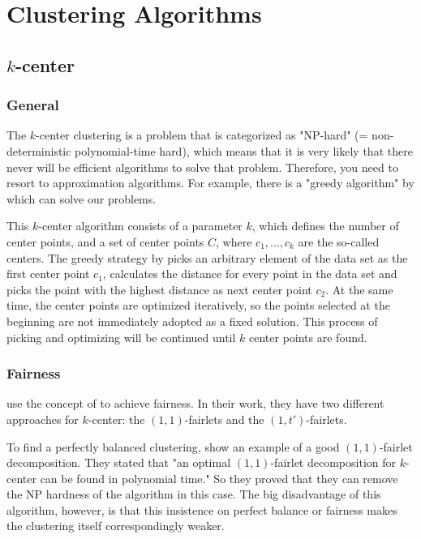 \section{Clustering Algorithms}
\label{clustering-algorithms}


\subsection{$k$-center}
\label{k-center}

\subsubsection{General}
The $k$-center clustering is a problem that is categorized as "NP-hard" (= non-deterministic polynomial-time hard), which means that it is very likely that there never will be efficient algorithms to solve that problem. Therefore, you need to resort to approximation algorithms.
For example, there is a "greedy algorithm" by \textcite[]{Gonzalez1985ClusteringDistance} which can solve our problems.

This $k$-center algorithm consists of a parameter $k$, which defines the number of center points, and a set of center points $C$, where $c_{1},...,c_{k}$ are the so-called centers. \autocite[]{Kleindessner2019FairSummarization}
The greedy strategy by \textcite[]{Gonzalez1985ClusteringDistance} picks an arbitrary element of the data set as the first center point $c_{1}$, calculates the distance for every point in the data set and picks the point with the highest distance as next center point $c_{2}$. At the same time, the center points are optimized iteratively, so the points selected at the beginning are not immediately adopted as a fixed solution. This process of picking and optimizing will be continued until $k$ center points are found.

\subsubsection{Fairness}

\textcite[]{Chierichetti2018} use the concept of  to achieve fairness. In their work, they have two different approaches for $k$-center: the $(1,1)$-fairlets and the $(1,t')$-fairlets.

To find a perfectly balanced clustering, \textcite[]{Chierichetti2018} show an example of a good $(1, 1)$-fairlet decomposition. They stated that "an optimal $(1, 1)$-fairlet decomposition for $k$-center can be found in polynomial time." \autocite[6]{Chierichetti2018} So they proved that they can remove the NP hardness of the algorithm in this case. The big disadvantage of this algorithm, however, is that this insistence on perfect balance or fairness makes the clustering itself correspondingly weaker.

